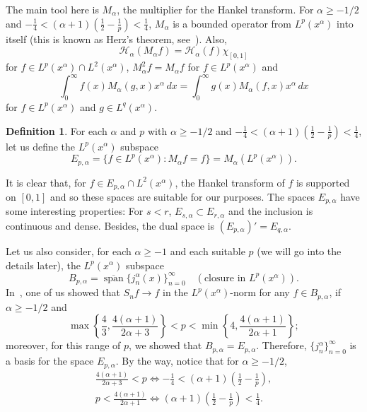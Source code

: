 \documentclass[reqno]{amsart}
\theoremstyle{plain}
\theoremstyle{definition}
\newtheorem{Defn}{Definition}
\theoremstyle{remark}
\newcommand{\spa}{\operatorname{span}} %
\newcommand{\htr}{\mathcal{H}_\alpha} %
\begin{document}
The main tool here is $M_\alpha$, the multiplier for the Hankel transform. For
$\alpha \geq -1/2$ and $-\frac14 < (\alpha+1)(\frac12-\frac1p) < \frac14$,
$M_\alpha$ is a bounded operator from $L^p(x^\alpha)$ into itself (this is
known as Herz's theorem, see~\cite{Herz}). Also,
\begin{equation*}
    \htr(M_\alpha f) = \htr(f) \chi_{[0,1]}
\end{equation*}
for $f \in L^p(x^\alpha) \cap L^2(x^\alpha)$, $M_\alpha^2 f = M_\alpha f$ for
$f \in L^p(x^\alpha)$ and
\begin{equation}
\label{ec:Mafg}
    \int_0^\infty f(x) M_\alpha(g,x) x^\alpha\,dx
    = \int_0^\infty g(x) M_\alpha(f,x) x^\alpha\,dx
\end{equation}
for $f \in L^p(x^\alpha)$ and $g \in L^q(x^\alpha)$.

\begin{Defn}
For each $\alpha$ and $p$ with $\alpha \geq -1/2$ and
$-\frac14 < (\alpha+1)(\frac12-\frac1p) < \frac14$, let us define the
$L^p(x^\alpha)$ subspace
\begin{equation*}
    E_{p,\alpha} = \{ f \in L^p(x^\alpha): M_\alpha f = f\}
    = M_\alpha(L^p(x^\alpha)).
\end{equation*}
\end{Defn}

It is clear that, for $f \in E_{p,\alpha} \cap L^2(x^\alpha)$, the Hankel
transform of $f$ is supported on $[0,1]$ and so these spaces are suitable
for our purposes.
The spaces $E_{p,\alpha}$ have some interesting properties: For $s<r$,
$E_{s,\alpha} \subset E_{r,\alpha}$ and the inclusion is continuous and dense.
Besides, the dual space is $(E_{p,\alpha})' = E_{q,\alpha}$.

Let us also consider, for each $\alpha \geq -1$ and each suitable $p$ (we will
go into the details later), the $L^p(x^\alpha)$ subspace
\begin{equation*}
	B_{p,\alpha} = \overline{\spa} \{j_n^\alpha(x)\}_{n=0}^\infty
   \quad (\text{closure in } L^p(x^\alpha)).
\end{equation*}
In~\cite{Var}, one of us showed that $S_nf \to f$ in the $L^p(x^\alpha)$-norm
for any $f \in B_{p,\alpha}$, if $\alpha \geq -1/2$ and
\begin{equation*}
    \max\left\{ \frac43, \frac{4(\alpha+1)}{2\alpha+3} \right\}
    < p <
    \min\left\{ 4, \frac{4(\alpha+1)}{2\alpha+1}\right\};
\end{equation*}
moreover, for this range of $p$, we showed that
$B_{p,\alpha} = E_{p,\alpha}$. Therefore,
$\{j_n^\alpha\}_{n=0}^\infty$ is a basis for the space $E_{p,\alpha}$. By the
way, notice that for $\alpha \geq -1/2$,
\begin{gather*}
   \frac{4(\alpha+1)}{2\alpha+3} < p
   \iff -\frac14 < (\alpha+1) \left( \frac12 - \frac1p \right), \\
   p < \frac{4(\alpha+1)}{2\alpha+1}
   \iff (\alpha+1) \left( \frac12 - \frac1p \right) < \frac 14.
\end{gather*}
\end{document}
